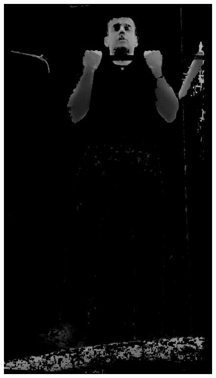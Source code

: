 \begin{figure}[H]
    \centering
        \begin{minipage}{\sizeImg\textwidth}
            \includegraphics[width=\textwidth]{figuras/ultrapassar_barra/134_gray.png}
        \end{minipage}
        \begin{minipage}{\sizeImg\textwidth}

\end{minipage}
\end{figure}
